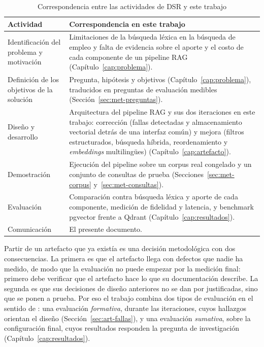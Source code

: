 \begin{table}[htbp!]
    \centering
    \caption{Correspondencia entre las actividades de DSR \citep{Peffers2007} y este trabajo}
    \label{tab:met-peffers}
    \begin{tabular}{|p{4.2cm}|p{10cm}|}
        \hline
        \textbf{Actividad} & \textbf{Correspondencia en este trabajo} \\
        \hline
        Identificación del problema y motivación & Limitaciones de la búsqueda léxica en la búsqueda de empleo y falta de evidencia sobre el aporte y el costo de cada componente de un pipeline RAG (Capítulo~\ref{cap:problema}). \\
        \hline
        Definición de los objetivos de la solución & Pregunta, hipótesis y objetivos (Capítulo~\ref{cap:problema}), traducidos en preguntas de evaluación medibles (Sección~\ref{sec:met-preguntas}). \\
        \hline
        Diseño y desarrollo & Arquitectura del pipeline RAG y sus dos iteraciones en este trabajo: corrección (fallas detectadas y almacenamiento vectorial detrás de una interfaz común) y mejora (filtros estructurados, búsqueda híbrida, reordenamiento y \textit{embeddings} multilingües) (Capítulo~\ref{cap:artefacto}). \\
        \hline
        Demostración & Ejecución del pipeline sobre un corpus real congelado y un conjunto de consultas de prueba (Secciones~\ref{sec:met-corpus} y~\ref{sec:met-consultas}). \\
        \hline
        Evaluación & Comparación contra búsqueda léxica y aporte de cada componente, medición de fidelidad y latencia, y benchmark pgvector frente a Qdrant (Capítulo~\ref{cap:resultados}). \\
        \hline
        Comunicación & El presente documento. \\
        \hline
    \end{tabular}
\end{table}

Partir de un artefacto que ya existía es una decisión metodológica con dos consecuencias. La primera es que el artefacto llega con defectos que nadie ha medido, de modo que la evaluación no puede empezar por la medición final: primero debe verificar que el artefacto hace lo que su documentación describe. La segunda es que sus decisiones de diseño anteriores no se dan por justificadas, sino que se ponen a prueba. Por eso el trabajo combina dos tipos de evaluación en el sentido de \citet{Venable2016}: una evaluación \emph{formativa}, durante las iteraciones, cuyos hallazgos orientan el diseño (Sección~\ref{sec:art-fallas}), y una evaluación \emph{sumativa}, sobre la configuración final, cuyos resultados responden la pregunta de investigación (Capítulo~\ref{cap:resultados}).

